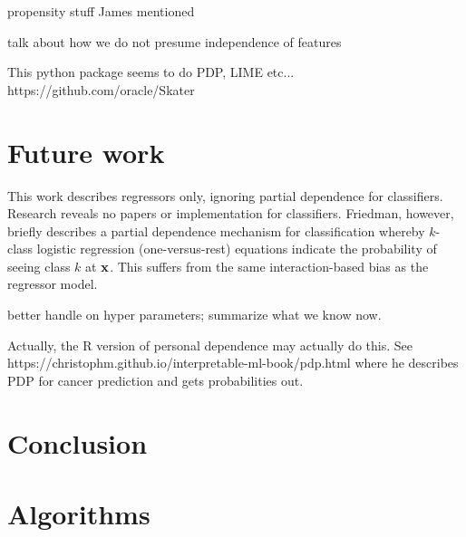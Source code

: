 \documentclass[12pt]{article}
\begin{document}
propensity stuff James mentioned

talk about how we do not presume independence of features
 
This python package seems to do PDP, LIME etc... https://github.com/oracle/Skater

\section{Future work}

This work describes regressors only, ignoring partial dependence for classifiers.  Research reveals no papers or implementation for classifiers. Friedman, however, briefly describes a partial dependence mechanism for classification whereby $k$-class logistic regression (one-versus-rest) equations indicate the probability of seeing class $k$ at $\bf{x}$.  This suffers from the same interaction-based bias as the regressor model.

better handle on hyper parameters; summarize what we know now.

Actually, the R version of personal dependence may actually do this. See https://christophm.github.io/interpretable-ml-book/pdp.html where he describes PDP for cancer prediction and gets probabilities out.

\section{Conclusion}
\label{sec:conc}

\section{Algorithms}
\end{document}
